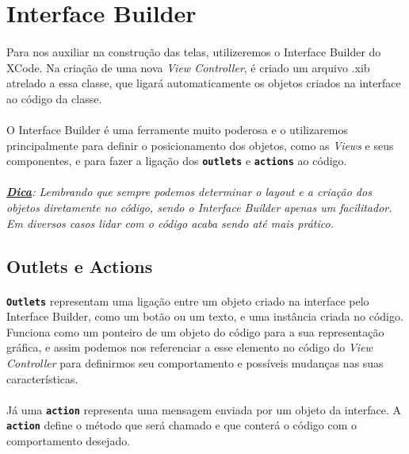 \documentclass[a4paper,12pt,brazil,doubleside]{book}
\begin{document}
\bigskip


\section{Interface Builder}

\paragraph{}Para nos auxiliar na construção das telas, utilizeremos o Interface Builder do XCode. Na criação de uma nova \emph{View Controller}, é criado um arquivo .xib atrelado a essa classe, que ligará automaticamente os objetos criados na interface ao código da classe.
\paragraph{}O Interface Builder é uma ferramente muito poderosa e o utilizaremos principalmente para definir o posicionamento dos objetos, como as \emph{Views} e seus componentes, e para fazer a ligação dos \texttt{\textbf{outlets}} e \texttt{\textbf{actions}} ao código.
\paragraph{}\textit{\textbf{\underline{Dica}}: Lembrando que sempre podemos determinar o layout e a criação dos objetos diretamente no código, sendo o Interface Builder apenas um facilitador. Em diversos casos lidar com o código acaba sendo até mais prático.}

\bigskip

\subsection{Outlets e Actions}

\paragraph{}\texttt{\textbf{Outlets}} representam uma ligação entre um objeto criado na interface pelo Interface Builder, como um botão ou um texto, e uma instância criada no código. Funciona como um ponteiro de um objeto do código para a sua representação gráfica, e assim podemos nos referenciar a esse elemento no código do \emph{View Controller} para definirmos seu comportamento e possíveis mudanças nas suas características.
\paragraph{}Já uma \texttt{\textbf{action}} representa uma mensagem enviada por um objeto da interface. A \texttt{\textbf{action}} define o método que será chamado e que conterá o código com o comportamento desejado.
\end{document}
